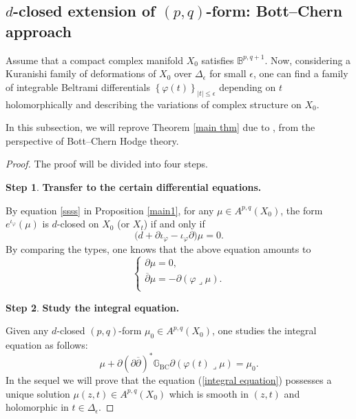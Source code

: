 \documentclass[12pt]{amsart}
\numberwithin{equation}{section}
\theoremstyle{definition}
\newtheorem{step}{Step}
\theoremstyle{definition}
\theoremstyle{definition}
\renewcommand{\1}{\mathsf{1}}
\newcommand{\G}{\mathbb{G}}
\newcommand{\beq}{\begin{equation}}
\newcommand{\eeq}{\end{equation}}
\renewcommand{\>}{\rightarrow}
\newcommand{\p}{\partial}
\newcommand{\bp}{\overline\partial}
\def\p{\partial}
\def\l{\lrcorner}
\theoremstyle{plain} %
\theoremstyle{plain} %
\theoremstyle{plain} %
\begin{document}
	\subsection{$d$-closed extension of $(p,q)$-form: Bott--Chern  approach}\label{important}
	
	Assume that a compact complex manifold $X_0$ satisfies $\mathbb B^{p,q+1}.$ Now, considering a Kuranishi family of deformations of $X_0$ over $\Delta_\epsilon$ for small $\epsilon$, one can find a family of integrable Beltrami differentials $\left\{\varphi(t)\right\}_{|t|\leq\epsilon} $  depending on $t$ holomorphically and describing the variations of complex structure on $X_0$.
	
	In this subsection, we will reprove Theorem \ref{main thm} due to \cite{WZ20}, from the perspective of  Bott--Chern Hodge theory.
	\begin{proof}	
		The proof will be divided into four steps.
		\begin{step}\label{step 1}
			{\rm\textbf{Transfer to the certain differential equations.}}\end{step}
By  equation \eqref{ssss} in Proposition \ref{main1}, for any $\mu \in A^{p,q}(X_0)$, the form $e^{\iota_{\varphi}}(\mu)$ is $d$-closed on $X_0$ (or $X_t$) if and only if
\[
\bigl(d + \partial \iota_{\varphi} - \iota_{\varphi} \partial\bigr) \mu = 0.
\]
		By comparing the types, one knows that the above equation amounts to
		\beq\label{!!}
		\begin{cases}
			\p\mu=0,\\
			\bp\mu=-\p(\varphi\l\mu).\\
		\end{cases}
		\eeq
		\begin{step}\label{step 2}
			{\rm\textbf{Study the integral equation.}}\end{step}
		Given any $d$-closed $(p,q)$-form $\mu_0\in A^{p,q}(X_0)$, one studies the integral equation as follows:
		\beq\label{integral equation}
		\mu+\p{(\p\bp)}^*\G_{\mathrm {BC}}\p({\varphi(t)}\l\mu)=\mu_{0}.
		\eeq
		In the sequel we will prove that the equation (\ref{integral equation}) possesses a unique solution $\mu(z,t)\in A^{p,q}(X_0)$ which is smooth  in $(z,t)$ and holomorphic in  $t\in \Delta_\epsilon$.
		

\end{proof}
\end{document}
